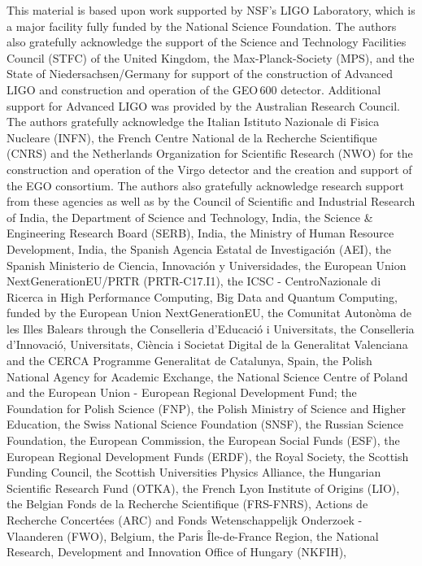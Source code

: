 This material is based upon work supported by NSF's LIGO Laboratory, which is a
major facility fully funded by the National Science Foundation.
The authors also gratefully acknowledge the support of
the Science and Technology Facilities Council (STFC) of the
United Kingdom, the Max-Planck-Society (MPS), and the State of
Niedersachsen/Germany for support of the construction of Advanced LIGO
and construction and operation of the GEO\,600 detector.
Additional support for Advanced LIGO was provided by the Australian Research Council.
The authors gratefully acknowledge the Italian Istituto Nazionale di Fisica Nucleare (INFN),
the French Centre National de la Recherche Scientifique (CNRS) and
the Netherlands Organization for Scientific Research (NWO)
for the construction and operation of the Virgo detector
and the creation and support  of the EGO consortium.
The authors also gratefully acknowledge research support from these agencies as well as by
the Council of Scientific and Industrial Research of India,
the Department of Science and Technology, India,
the Science \& Engineering Research Board (SERB), India,
the Ministry of Human Resource Development, India,
the Spanish Agencia Estatal de Investigaci\'on (AEI),
the Spanish Ministerio de Ciencia, Innovaci\'on y Universidades,
the European Union NextGenerationEU/PRTR (PRTR-C17.I1),
the ICSC - CentroNazionale di Ricerca in High Performance Computing, Big Data
and Quantum Computing, funded by the European Union NextGenerationEU,
the Comunitat Auton\`oma de les Illes Balears through the Conselleria d'Educaci\'o i Universitats,
the Conselleria d'Innovaci\'o, Universitats, Ci\`encia i Societat Digital de la Generalitat Valenciana and
the CERCA Programme Generalitat de Catalunya, Spain,
the Polish National Agency for Academic Exchange,
the National Science Centre of Poland and the European Union - European Regional
Development Fund;
the Foundation for Polish Science (FNP),
the Polish Ministry of Science and Higher Education,
the Swiss National Science Foundation (SNSF),
the Russian Science Foundation,
the European Commission,
the European Social Funds (ESF),
the European Regional Development Funds (ERDF),
the Royal Society,
the Scottish Funding Council,
the Scottish Universities Physics Alliance,
the Hungarian Scientific Research Fund (OTKA),
the French Lyon Institute of Origins (LIO),
the Belgian Fonds de la Recherche Scientifique (FRS-FNRS),
Actions de Recherche Concert\'ees (ARC) and
Fonds Wetenschappelijk Onderzoek - Vlaanderen (FWO), Belgium,
the Paris \^{I}le-de-France Region,
the National Research, Development and Innovation Office of Hungary (NKFIH),
